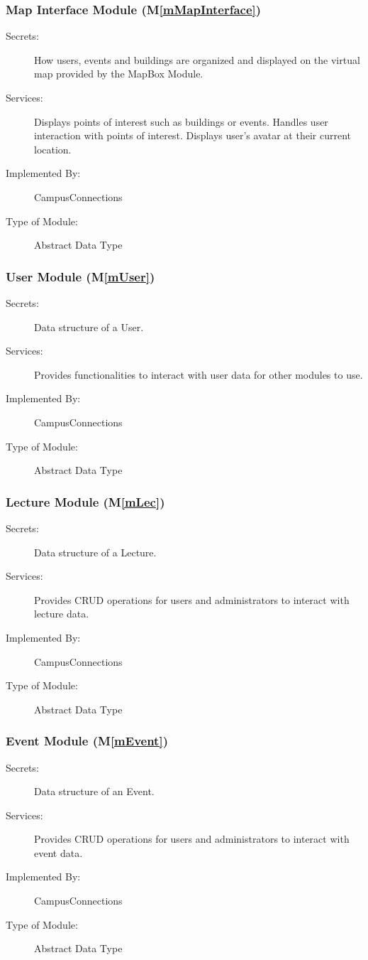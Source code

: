 \documentclass[12pt, titlepage]{article}
\newcommand{\mref}[1]{M\ref{#1}}
\begin{document}
\subsubsection{Map Interface Module (\mref{mMapInterface})}
\begin{description}
\item[Secrets:]How users, events and buildings are organized and displayed on the virtual map provided by the MapBox Module.
\item[Services:]Displays points of interest such as buildings or events. Handles user interaction with points of interest. Displays user's avatar at their current location.
\item[Implemented By:] CampusConnections
\item[Type of Module:] Abstract Data Type
\end{description}

\subsubsection{User Module (\mref{mUser})}
\begin{description}
  \item[Secrets:]Data structure of a User.
  \item[Services:]Provides functionalities to interact with user data for other modules to use.
  \item[Implemented By:] CampusConnections
  \item[Type of Module:] Abstract Data Type
\end{description}

\subsubsection{Lecture Module (\mref{mLec})}
\begin{description}
  \item[Secrets:]Data structure of a Lecture.
  \item[Services:]Provides CRUD operations for users and administrators to interact with lecture data.
  \item[Implemented By:] CampusConnections
  \item[Type of Module:] Abstract Data Type
\end{description}

\subsubsection{Event Module (\mref{mEvent})}
\begin{description}
  \item[Secrets:]Data structure of an Event.
  \item[Services:]Provides CRUD operations for users and administrators to interact with event data.
  \item[Implemented By:] CampusConnections
  \item[Type of Module:] Abstract Data Type
\end{description}
\end{document}
